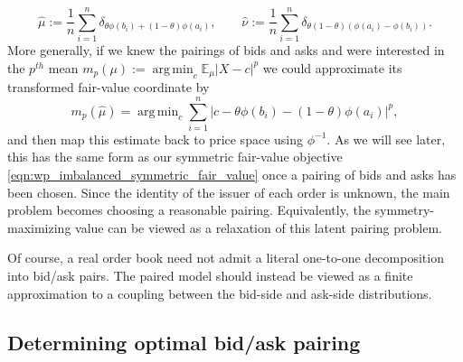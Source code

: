 \documentclass[11pt]{article}
\theoremstyle{plain}
\theoremstyle{definition}
\numberwithin{equation}{section}
\newcommand{\E}{\mathbb{E}}
\DeclareMathOperator*{\argmin}{arg\,min}
\begin{document}
\[\hat{\mu} := \frac{1}{n} \sum_{i=1}^n
\delta_{\theta\phi(b_i)+(1-\theta)\phi(a_i)}, \qquad
\hat{\nu} := \frac{1}{n} \sum_{i=1}^n
\delta_{\theta(1-\theta)(\phi(a_i)-\phi(b_i))}.\]
\noindent More generally, if we knew the pairings of bids and asks and were
 interested in the $p^{th}$ mean $m_p(\mu) := \argmin_c \E_\mu |X-c|^p$ we
 could approximate its transformed fair-value coordinate by
\[m_p(\hat{\mu}) = \argmin_c \sum_{i=1}^n
|c-\theta\phi(b_i)-(1-\theta)\phi(a_i)|^p,\]
%
\noindent and then map this estimate back to price space using $\phi^{-1}$.
 \noindent As we will see later, this has the same form as our symmetric fair-value objective \eqref{eqn:wp_imbalanced_symmetric_fair_value} once a pairing of bids and asks has been chosen.
 Since the identity of the issuer of each order is unknown, the main problem becomes choosing a reasonable pairing.
 Equivalently, the symmetry-maximizing value can be viewed as a relaxation of this latent pairing problem.

 Of course, a real order book need not admit a literal one-to-one
decomposition into bid/ask pairs. The paired model should instead be viewed as
a finite approximation to a coupling between the bid-side and ask-side
distributions.

\subsection{Determining optimal bid/ask pairing}
\end{document}
